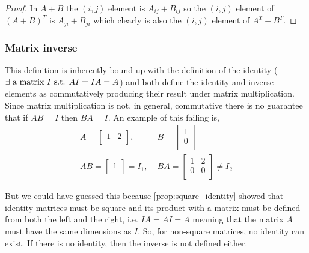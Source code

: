 \documentclass[../MathsNotesBase.tex]{subfiles}
\begin{document}
{		\medskip
		\begin{proof}
			In ${ A + B }$ the ${ (i,j) }$ element is ${ A_{ij} + B_{ij} }$ so the ${ (i,j) }$ element of ${ (A + B)^T }$ is ${ A_{ji} + B_{ji} }$ which clearly is also the ${ (i,j) }$ element of ${  A^T + B^T }$. \qedhere
		\end{proof}
		
		\bigskip
		\subsubsection{Matrix inverse}
		
		\medskip
		This definition is inherently bound up with the definition of the identity ($\exists \text{ a matrix } I \text{ s.t. } AI = IA = A$) and both define the identity and inverse elements as commutatively producing their result under matrix multiplication. Since matrix multiplication is not, in general, commutative there is no guarantee that if $AB = I$ then $BA = I$. An example of this failing is,
		\begin{align*}
			A = 
			\begin{bmatrix}
			1 & 2 \\
			\end{bmatrix},\;
			&B =
			\begin{bmatrix}
			1 \\
			0 \\
			\end{bmatrix}
			\\[10pt]
			AB = 
			\begin{bmatrix}
			1 \\
			\end{bmatrix} = I_1,\;
			&BA =
			\begin{bmatrix}
			1 & 2 \\
			0 & 0 \\
			\end{bmatrix} \neq I_2
		\end{align*}
		
		But we could have guessed this because \autoref{prop:square_identity} showed that identity matrices must be square and its product with a matrix must be defined from both the left and the right, i.e. $IA = AI = A$ meaning that the matrix $A$ must have the same dimensions as $I$. So, for non-square matrices, no identity can exist. If there is no identity, then the inverse is not defined either.
		
}
\end{document}
